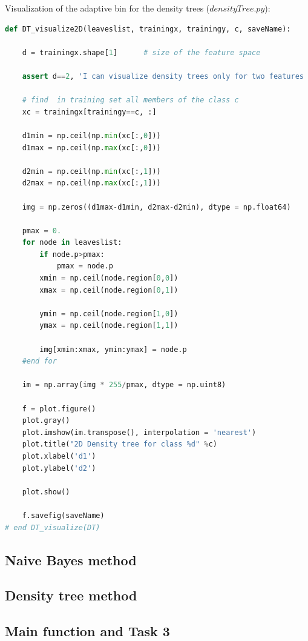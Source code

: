 \documentclass{article}
\begin{document}
\FloatBarrier

Visualization of the adaptive bin for the density trees ($densityTree.py$):

\begin{lstlisting}[language=Python]
def DT_visualize2D(leaveslist, trainingx, trainingy, c, saveName):

    d = trainingx.shape[1]      # size of the feature space
    
    assert d==2, 'I can visualize density trees only for two features :('
    
    # find  in training set all members of the class c
    xc = trainingx[trainingy==c, :]        
    
    d1min = np.ceil(np.min(xc[:,0]))
    d1max = np.ceil(np.max(xc[:,0]))
    
    d2min = np.ceil(np.min(xc[:,1]))
    d2max = np.ceil(np.max(xc[:,1]))
    
    img = np.zeros((d1max-d1min, d2max-d2min), dtype = np.float64)

    pmax = 0.  
    for node in leaveslist:
        if node.p>pmax:
            pmax = node.p
        xmin = np.ceil(node.region[0,0])
        xmax = np.ceil(node.region[0,1])
        
        ymin = np.ceil(node.region[1,0])
        ymax = np.ceil(node.region[1,1])

        img[xmin:xmax, ymin:ymax] = node.p
    #end for    
    
    im = np.array(img * 255/pmax, dtype = np.uint8)
    
    f = plot.figure() 
    plot.gray()
    plot.imshow(im.transpose(), interpolation = 'nearest')       
    plot.title("2D Density tree for class %d" %c)
    plot.xlabel('d1')
    plot.ylabel('d2')    

    plot.show()
   
    f.savefig(saveName)  
# end DT_visualize(DT)
\end{lstlisting}

\subsection{Naive Bayes method}

\subsection{Density tree method}

\subsection{Main function and Task 3}

\end{document}
